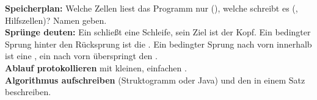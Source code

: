 \documentclass[11pt,a4paper]{article}
\begin{document}
\begin{merke}
\lueckentext
{} \textbf{Speicherplan:} Welche Zellen liest das Programm nur (), welche schreibt es (, Hilfszellen)? Namen geben.\\
 \textbf{Sprünge deuten:} Ein  schließt eine Schleife, sein Ziel ist der Kopf. Ein bedingter Sprung hinter den Rücksprung ist die
. Ein bedingter Sprung nach vorn innerhalb ist eine , ein  nach vorn
überspringt den .\\
 \textbf{Ablauf protokollieren} mit kleinen, einfachen .\\
 \textbf{Algorithmus aufschreiben} (Struktogramm oder Java) und den  in einem Satz beschreiben.
\end{merke}
\end{document}
